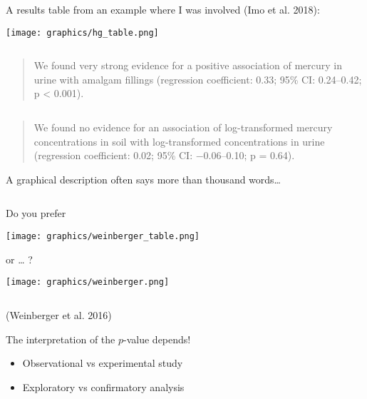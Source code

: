 \documentclass[
  10pt,
  ignorenonframetext,
]{beamer}
\providecommand{\tightlist}{%
  \setlength{\itemsep}{0pt}\setlength{\parskip}{0pt}}
\begin{document}
\begin{frame}
A results table from an example where I was involved (Imo et al. 2018):

\centering

\texttt{[image: graphics/hg\_table.png]}

\(~\)

\begin{quote}
We found very strong evidence for a positive association of mercury in
urine with amalgam fillings (regression coefficient: 0.33; 95\% CI:
0.24--0.42; p \textless{} 0.001).
\end{quote}

\(~\)

\begin{quote}
We found no evidence for an association of log-transformed mercury
concentrations in soil with log-transformed concentrations in urine
(regression coefficient: 0.02; 95\% CI: −0.06--0.10; p = 0.64).
\end{quote}
\end{frame}

\begin{frame}
A graphical description often says more than thousand words\ldots{}

\(~\)

Do you prefer

\centering

\texttt{[image: graphics/weinberger\_table.png]}
\end{frame}

\begin{frame}
or \ldots{} ?

\centering\texttt{[image: graphics/weinberger.png]}

\(~\)

\flushleft
\scriptsize

(Weinberger et al. 2016)
\end{frame}

\begin{frame}
\begin{block}{The interpretation of the \(p\)-value depends!}
\protect\hypertarget{the-interpretation-of-the-p-value-depends}{}
\(~\)

\begin{itemize}
\tightlist
\item
  Observational vs experimental study
\end{itemize}

\vspace{2mm}

\begin{itemize}
\tightlist
\item
  Exploratory vs confirmatory analysis
\end{itemize}
\end{block}
\end{frame}
\end{document}
